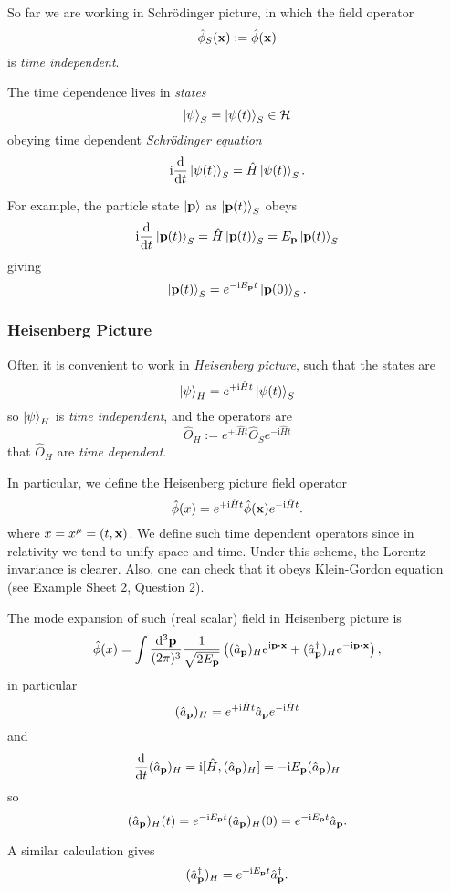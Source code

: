 \documentclass[a4paper,11pt]{article}
\begin{document}
	So far we are working in Schr\"odinger picture, in which the field operator
	\[
		\hat \phi_S(\vb x) := \hat \phi(\vb x)
	\]
	is \emph{time independent}.

	The time dependence lives in \emph{states}
	\[
		\ket{\psi}_S = \ket{\psi(t)}_S \in \mathcal{H}
	\]
	obeying time dependent \emph{Schr\"odinger equation}
	\[
		\mathrm{i} \dv{t} \ket{\psi(t)}_S = \hat H \ket{\psi(t)}_S.
	\]
	
	For example, the particle state $\ket{\vb p}$ as $\ket{\vb p(t)}_S$ obeys
	\[
		\mathrm{i} \dv{t} \ket{\vb p(t)}_S = \hat H \ket{\vb p(t)}_S = E _{\vb p} \ket{\vb p(t)}_S
	\]
	giving
	\[
		\ket{\vb p(t)}_S = e ^{- \mathrm{i} E _{\vb p}t}\ket{\vb p(0)}_S.
	\]

	\subsubsection{Heisenberg Picture}

	Often it is convenient to work in \emph{Heisenberg picture}, such that the states are
	\[
		\ket{\psi}_H = e ^{+ \mathrm{i} \hat H t} \ket{\psi (t)}_S
	\]
	so $\ket{\psi}_H$ is \emph{time independent}, and the operators are
	\[
		\hat O_H := e ^{+ \mathrm{i} \hat H t} \hat O_S e ^{- \mathrm{i} \hat H t}
	\]
	that $\hat O_H$ are \emph{time dependent}.

	In particular, we define the Heisenberg picture field operator
	\[
		\hat \phi(x) = e ^{+ \mathrm{i} \hat H t}\hat \phi(\vb x)e ^{- \mathrm{i}\hat H t}.
	\]
	where $x = x^\mu = (t, \vb x)$. We define such time dependent operators since in relativity we tend to unify space and time. Under this scheme, the Lorentz invariance is clearer. Also, one can check that it obeys Klein-Gordon equation (see Example Sheet 2, Question 2).

	The mode expansion of such (real scalar) field in Heisenberg picture is
	\[
		\hat \phi(x) = \int \ddk{\vb p}{3} \frac{1}{\sqrt{2 E _{\vb p}}} \left( (\hat a _{\vb p})_H e ^{\mathrm{i} \vb p \vdot \vb x} + (\hat a^{\dagger}_{\vb p})_H e ^{- \mathrm{i} \vb p \vdot \vb x} \right),
	\]
	in particular
	\[
		(\hat a _{\vb p})_H = e ^{+ \mathrm{i} \hat H t}\hat a _{\vb p} e ^{-\mathrm{i} \hat H t}
	\]
	and 
	\[
		\dv{t}\/(\hat a _{\vb p})_H = \mathrm{i} [\hat H, (\hat a _{\vb p})_H] = - \mathrm{i} E _{\vb p} (\hat a _{\vb p})_H
	\]
	so
	\[
		(\hat a _{\vb p})_H (t) = e ^{- \mathrm{i} E _{\vb p}t} (\hat a _{\vb p})_H(0) = e ^{-\mathrm{i} E _{\vb p}t}\hat a _{\vb p}.
	\]
	
	A similar calculation gives
	\[
		(\hat a^{\dagger}_{\vb p})_H = e ^{+\mathrm{i} E _{\vb p}t} \hat a^{\dagger} _{\vb p}.
	\]
	
\end{document}
